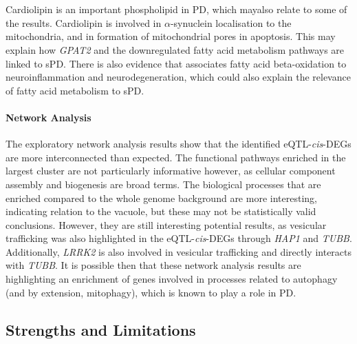 \documentclass{article}
\begin{document}
\\
\\Cardiolipin is an important phospholipid in PD, which mayalso relate to some of the results. Cardiolipin is involved in $\alpha$-synuclein localisation to the mitochondria\cite{Ghio2016InteractionCardiolipin}, and in formation of mitochondrial pores in apoptosis\cite{Vringer2023MitochondriaInflammation}. This may explain how \textit{GPAT2} and the downregulated fatty acid metabolism pathways are linked to sPD. There is also evidence that associates fatty acid beta-oxidation to neuroinflammation and neurodegeneration\cite{Bogie2020FattyDisorders}, which could also explain the relevance of fatty acid metabolism to sPD.
\paragraph{Network Analysis}
The exploratory network analysis results show that the identified eQTL-\textit{cis}-DEGs are more interconnected than expected. The functional pathways enriched in the largest cluster are not particularly informative however, as cellular component assembly and biogenesis are broad terms. The biological processes that are enriched compared to the whole genome background are more interesting, indicating relation to the vacuole, but these may not be statistically valid conclusions. However, they are still interesting potential results, as vesicular trafficking was also highlighted in the eQTL-\textit{cis}-DEGs through \textit{HAP1} and \textit{TUBB}. Additionally, \textit{LRRK2} is also involved in vesicular trafficking\cite{Usmani2021TheDisease} and directly interacts with \textit{TUBB}\cite{Law2014AAcetylation}. It is possible then that these network analysis results are highlighting an enrichment of genes involved in processes related to autophagy (and by extension, mitophagy), which is known to play a role in PD\cite{Lizama2021NeuronalDisease}.
\subsection{Strengths and Limitations}
\end{document}
